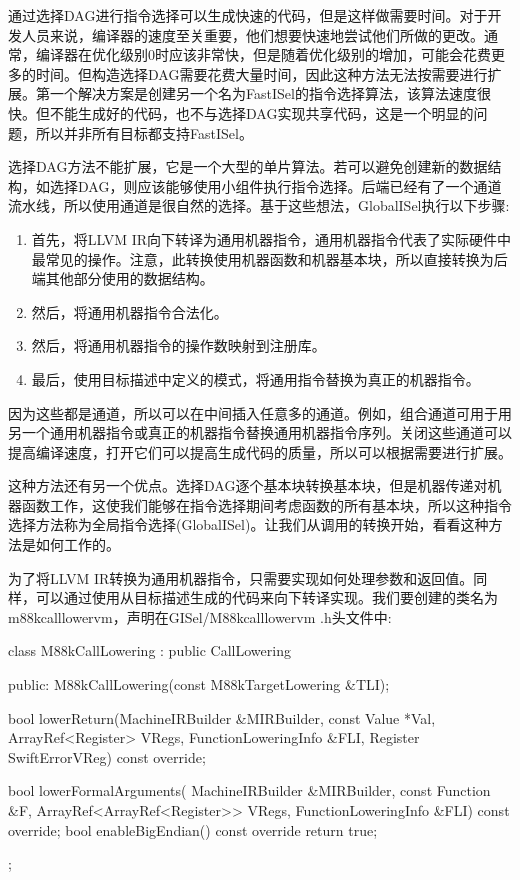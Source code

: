 
通过选择DAG进行指令选择可以生成快速的代码，但是这样做需要时间。对于开发人员来说，编译器的速度至关重要，他们想要快速地尝试他们所做的更改。通常，编译器在优化级别0时应该非常快，但是随着优化级别的增加，可能会花费更多的时间。但构造选择DAG需要花费大量时间，因此这种方法无法按需要进行扩展。第一个解决方案是创建另一个名为FastISel的指令选择算法，该算法速度很快。但不能生成好的代码，也不与选择DAG实现共享代码，这是一个明显的问题，所以并非所有目标都支持FastISel。

选择DAG方法不能扩展，它是一个大型的单片算法。若可以避免创建新的数据结构，如选择DAG，则应该能够使用小组件执行指令选择。后端已经有了一个通道流水线，所以使用通道是很自然的选择。基于这些想法，GlobalISel执行以下步骤:

\begin{enumerate}
\item
首先，将LLVM IR向下转译为通用机器指令，通用机器指令代表了实际硬件中最常见的操作。注意，此转换使用机器函数和机器基本块，所以直接转换为后端其他部分使用的数据结构。

\item
然后，将通用机器指令合法化。

\item
然后，将通用机器指令的操作数映射到注册库。

\item
最后，使用目标描述中定义的模式，将通用指令替换为真正的机器指令。
\end{enumerate}

因为这些都是通道，所以可以在中间插入任意多的通道。例如，组合通道可用于用另一个通用机器指令或真正的机器指令替换通用机器指令序列。关闭这些通道可以提高编译速度，打开它们可以提高生成代码的质量，所以可以根据需要进行扩展。

这种方法还有另一个优点。选择DAG逐个基本块转换基本块，但是机器传递对机器函数工作，这使我们能够在指令选择期间考虑函数的所有基本块，所以这种指令选择方法称为全局指令选择(GlobalISel)。让我们从调用的转换开始，看看这种方法是如何工作的。



为了将LLVM IR转换为通用机器指令，只需要实现如何处理参数和返回值。同样，可以通过使用从目标描述生成的代码来向下转译实现。我们要创建的类名为m88kcalllowervm，声明在GISel/M88kcalllowervm .h头文件中:

\begin{cpp}
class M88kCallLowering : public CallLowering {
public:
    M88kCallLowering(const M88kTargetLowering &TLI);

    bool
    lowerReturn(MachineIRBuilder &MIRBuilder,
                const Value *Val,
                ArrayRef<Register> VRegs,
                FunctionLoweringInfo &FLI,
                Register SwiftErrorVReg) const override;

    bool lowerFormalArguments(
        MachineIRBuilder &MIRBuilder, const Function &F,
        ArrayRef<ArrayRef<Register>> VRegs,
        FunctionLoweringInfo &FLI) const override;
    bool enableBigEndian() const override { return true; }
};
\end{cpp}

